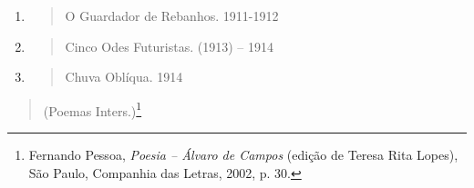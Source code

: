 \begin{enumerate}
\def\labelenumi{\arabic{enumi}.}
\item
  \begin{quote}
  O Guardador de Rebanhos. 1911-1912
  \end{quote}
\item
  \begin{quote}
  Cinco Odes Futuristas. (1913) -- 1914
  \end{quote}
\item
  \begin{quote}
  Chuva Oblíqua. 1914
  \end{quote}
\end{enumerate}

\begin{quote}
\forceindent (Poemas Inters.)\footnote{Fernando Pessoa, \emph{Poesia -- Álvaro de
  Campos} (edição de Teresa Rita Lopes), São Paulo, Companhia das
  Letras, 2002, p. 30.}
\end{quote}

